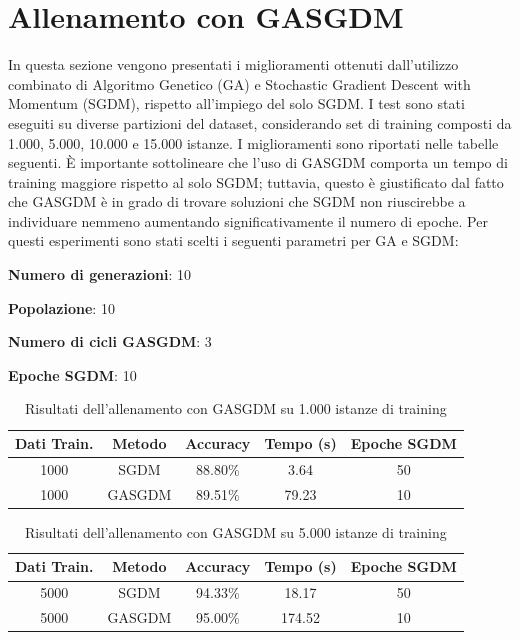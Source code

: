\section{Allenamento con GASGDM}
    In questa sezione vengono presentati i miglioramenti ottenuti dall'utilizzo combinato di Algoritmo Genetico (GA) e Stochastic Gradient Descent with Momentum (SGDM), rispetto all'impiego del solo SGDM. 
    I test sono stati eseguiti su diverse partizioni del dataset, considerando set di training composti da 1.000, 5.000, 10.000 e 15.000 istanze. 
    I miglioramenti sono riportati nelle tabelle seguenti. È importante sottolineare che l'uso di GASGDM comporta un tempo di training maggiore rispetto al solo SGDM; tuttavia, questo è giustificato dal fatto che GASGDM è in grado di trovare soluzioni che SGDM non riuscirebbe a individuare nemmeno aumentando significativamente il numero di epoche.
    Per questi esperimenti sono stati scelti i seguenti parametri per GA e SGDM:
    \begin{compactitemize}
        \item \textbf{Numero di generazioni}: 10
        \item \textbf{Popolazione}: 10
        \item \textbf{Numero di cicli GASGDM}: 3
        \item \textbf{Epoche SGDM}: 10
    \end{compactitemize}


\begin{table}[htbp]
\centering
\begin{tabular}{|c|c|c|c|c|}
\hline
\textbf{Dati Train.} & \textbf{Metodo} & \textbf{Accuracy} & \textbf{Tempo (s)} & \textbf{Epoche SGDM} \\
\hline
1000 & SGDM & 88.80\% & 3.64 & 50 \\
\hline
1000 & GASGDM & 89.51\% & 79.23 & 10 \\
\hline
\end{tabular}
\caption{Risultati dell'allenamento con GASGDM su 1.000 istanze di training}
\label{tab:GASGDM_results_1000}
\end{table}

\begin{table}[htbp]
\centering
\begin{tabular}{|c|c|c|c|c|}
\hline
\textbf{Dati Train.} & \textbf{Metodo} & \textbf{Accuracy} & \textbf{Tempo (s)} & \textbf{Epoche SGDM} \\
\hline
5000 & SGDM & 94.33\% & 18.17 & 50 \\
\hline
5000 & GASGDM & 95.00\% & 174.52 & 10 \\
\hline
\end{tabular}
\caption{Risultati dell'allenamento con GASGDM su 5.000 istanze di training}
\label{tab:GASGDM_results_5000}
\end{table}

